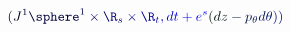 \documentclass[12pt]{article}
\begin{document}
\makeatletter
\renewcommand*{\@textcolor}[3]{%
  \protect\leavevmode
  \begingroup
    \color#1{#2}#3%
  \endgroup
}
\makeatother
\begin{displaymath}
\mathcolor[RGB]{0,0,15}{(} \mathcolor[RGB]{0,0,30}{J} ^ { \mathcolor[RGB]{0,0,45}{1} } \mathcolor[RGB]{0,0,60}{\sphere} ^ { \mathcolor[RGB]{0,0,75}{1} } \mathcolor[RGB]{0,0,90}{\times} \mathcolor[RGB]{0,0,105}{\R} _ { \mathcolor[RGB]{0,0,120}{s} } \mathcolor[RGB]{0,0,135}{\times} \mathcolor[RGB]{0,0,150}{\R} _ { \mathcolor[RGB]{0,0,165}{t} } \mathcolor[RGB]{0,0,180}{,} \mathcolor[RGB]{0,0,195}{d} \mathcolor[RGB]{0,0,210}{t} \mathcolor[RGB]{0,0,225}{+} \mathcolor[RGB]{0,0,240}{e} ^ { \mathcolor[RGB]{0,0,255}{s} } \mathcolor[RGB]{0,15,0}{(} \mathcolor[RGB]{0,15,15}{d} \mathcolor[RGB]{0,15,30}{z} \mathcolor[RGB]{0,15,45}{-} \mathcolor[RGB]{0,15,60}{p} _ { \mathcolor[RGB]{0,15,75}{\theta} } \mathcolor[RGB]{0,15,90}{d} \mathcolor[RGB]{0,15,105}{\theta} \mathcolor[RGB]{0,15,120}{)} \mathcolor[RGB]{0,15,135}{)}
\end{displaymath}
\end{document}
